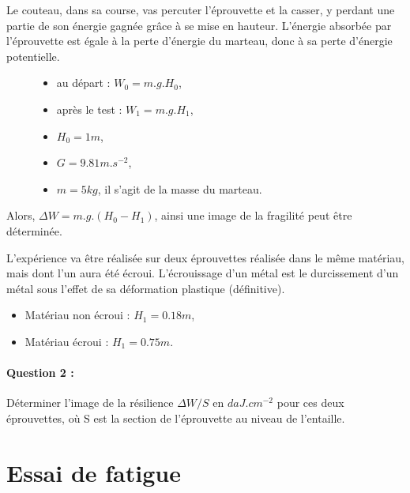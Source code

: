 \newpage

Le couteau, dans sa course, vas percuter l'éprouvette et la casser, y perdant une partie de son énergie gagnée grâce à se mise en hauteur. L'énergie absorbée par l'éprouvette est égale à la perte d'énergie du marteau, donc à sa perte d'énergie potentielle.

 \begin{figure}[!h]
 \begin{minipage}{0.4\linewidth}
\begin{itemize}
 \item au départ : $W_0 = m.g.H_0$,
 \item après le test : $W_1 = m.g.H_1$,
\end{itemize}
 \end{minipage}
\hfill
 \begin{minipage}{0.59\linewidth}
\begin{itemize}
 \item $H_0 = 1 m$,
 \item $G = 9.81 m.s^{-2}$,
 \item $m = 5 kg$, il s'agit de la masse du marteau.
\end{itemize}
 \end{minipage}
\end{figure}

Alors, $\Delta W = m.g.(H_0 - H_1)$, ainsi une image de la fragilité peut être déterminée.

L'expérience va être réalisée sur deux éprouvettes réalisée dans le même matériau, mais dont l'un aura été écroui. L'écrouissage d'un métal est le durcissement d'un métal sous l'effet de sa déformation plastique (définitive).

\begin{itemize}
 \item Matériau non écroui : $H_1=0.18 m$,
 \item Matériau écroui : $H_1=0.75 m$.
\end{itemize}

\paragraph{Question 2 :} Déterminer l'image de la résilience $\Delta W/S$ en $daJ.cm^{-2}$ pour ces deux éprouvettes, où S est la section de l'éprouvette au niveau de l'entaille.

\section{Essai de fatigue}

